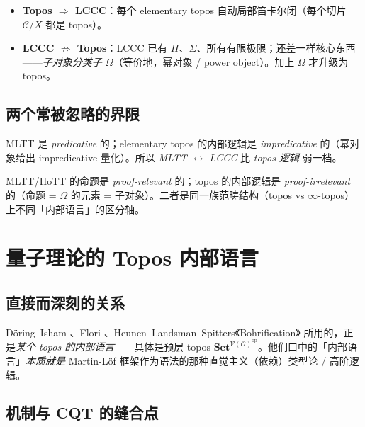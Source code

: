 \documentclass[10pt, openany]{book}
\begin{document}
\begin{itemize}
  \item \textbf{Topos $\Rightarrow$ LCCC}：每个 elementary topos 自动局部笛卡尔闭（每个切片 $\mathcal{C}/X$ 都是 topos）。
  \item \textbf{LCCC $\not\Rightarrow$ Topos}：LCCC 已有 $\Pi$、$\Sigma$、所有有限极限；还差一样核心东西——\emph{子对象分类子 $\Omega$}（等价地，幂对象 / power object）。加上 $\Omega$ 才升级为 topos。
\end{itemize}

\section{两个常被忽略的界限}

\begin{principle}
  MLTT 是 \emph{predicative} 的；elementary topos 的内部逻辑是 \emph{impredicative} 的（幂对象给出 impredicative 量化）。所以 \emph{MLTT $\leftrightarrow$ LCCC} 比 \emph{topos 逻辑} 弱一档。
\end{principle}

\begin{principle}
  MLTT/HoTT 的命题是 \emph{proof-relevant} 的；topos 的内部逻辑是 \emph{proof-irrelevant} 的（命题 = $\Omega$ 的元素 = 子对象）。二者是同一族范畴结构（topos vs $\infty$-topos）上不同「内部语言」的区分轴。
\end{principle}

\chapter{量子理论的 Topos 内部语言}

\section{直接而深刻的关系}

D\"oring--Isham \cite{DoringIsham2008a}、Flori \cite{Flori2013}、Heunen--Landsman--Spitters《Bohrification》\cite{HeunenLandsmanSpitters2009} 所用的，正是\emph{某个 topos 的内部语言}——具体是预层 topos $\mathbf{Set}^{\mathcal{V}(\mathcal{O})^{\mathrm{op}}}$。他们口中的「内部语言」\emph{本质就是} Martin-L\"of 框架作为语法的那种直觉主义（依赖）类型论 / 高阶逻辑。

\section{机制与 CQT 的缝合点}
\end{document}
